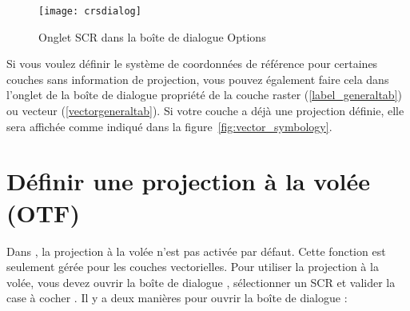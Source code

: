 \begin{figure}[ht]
   \begin{center}
   \caption{Onglet SCR dans la boîte de dialogue Options \qg
\nixcaption}\label{fig:crsdialog}\smallskip
   \texttt{[image: crsdialog]}
\end{center}
\end{figure}

Si vous voulez définir le système de coordonnées de référence pour certaines couches sans information de projection, vous pouvez également faire cela dans l'onglet  de la boîte de dialogue propriété de la couche raster (\ref{label_generaltab}) ou vecteur (\ref{vectorgeneraltab}).  Si votre couche a déjà une projection définie, elle sera affichée comme indiqué dans la figure~\ref{fig:vector_symbology}.

\section{Définir une projection à la volée (OTF)}\label{label_projstart}

Dans \qg, la projection à la volée n'est pas activée par défaut. Cette fonction est seulement gérée pour les couches vectorielles. Pour utiliser la projection à la volée, vous devez ouvrir la boîte de dialogue , sélectionner un  SCR et valider la case à cocher . Il y a deux manières pour ouvrir la boîte de dialogue :

